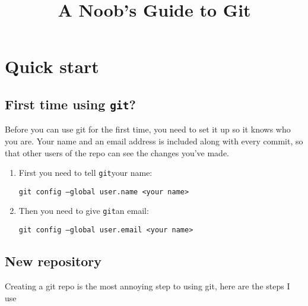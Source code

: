 \documentclass{article}
\title{A Noob's Guide to Git}
\date{ }
\newcommand\git{\texttt{git}}
\begin{document}
\maketitle

\section*{Quick start}

\subsection*{First time using \texttt{git}?}
Before you can use git for the first time, you need to set it up so it knows who you are. Your name and an email address is included along with every commit, so that other users of the repo can see the changes you've made.

\begin{enumerate}
	\item First you need to tell \git your name:
	
	\texttt{git config --global user.name <your name>}
	
	\item Then you need to give \git an email:
	
	\texttt{git config --global user.email <your name>}
\end{enumerate}

\subsection*{New repository}

Creating a git repo is the most annoying step to using git, here are the steps I use
\end{document}
